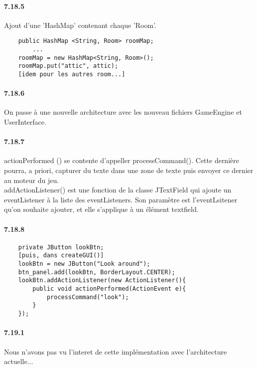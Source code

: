 \documentclass[11pt,a4paper]{report}
\begin{document}
\paragraph{7.18.5}
Ajout d'une 'HashMap' contenant chaque 'Room'.

\begin{lstlisting}
    public HashMap <String, Room> roomMap;
    	...
    roomMap = new HashMap<String, Room>();
    roomMap.put("attic", attic);
	[idem pour les autres room...]
\end{lstlisting}

\paragraph{7.18.6}

On passe à une nouvelle architecture avec les nouveau fichiers GameEngine et UserInterface.

\paragraph{7.18.7}
actionPerformed () se contente d'appeller processCommand().
Cette dernière pourra, a priori, capturer du texte dans une zone de texte puis envoyer ce dernier au moteur du jeu.\\

addActionListener() est une fonction de la classe JTextField qui ajoute
    un eventListener à la liste des eventListeners.
    Son paramètre est l'eventLsitener qu'on souhaite ajouter,
    et elle s'applique à un élément textfield.
    
\paragraph{7.18.8}
\begin{lstlisting}
    private JButton lookBtn;
	[puis, dans createGUI()]
    lookBtn = new JButton("Look around");
    btn_panel.add(lookBtn, BorderLayout.CENTER);
    lookBtn.addActionListener(new ActionListener(){
        public void actionPerformed(ActionEvent e){
            processCommand("look");
        }
    });
\end{lstlisting}    

\paragraph{7.19.1}
Nous n'avons pas vu l'interet de cette implémentation avec l'architecture actuelle...
\end{document}
